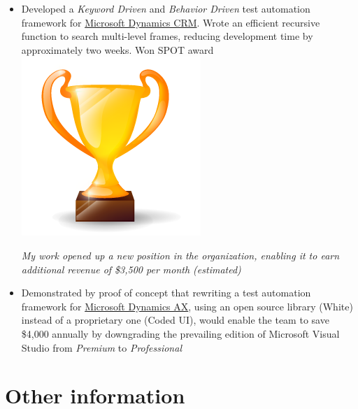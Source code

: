 \documentclass[letterpaper]{tenseconds} %
\begin{document}
\begin{twenty}
{\begin{itemize}
        \item Developed a \textit{Keyword Driven} and \textit{Behavior Driven} test automation framework for \href{https://www.microsoft.com/en-ca/dynamics/crm.aspx}{Microsoft Dynamics CRM}. Wrote an efficient recursive function to search multi-level frames, reducing development time by approximately two weeks. Won SPOT award {\includegraphics[scale=0.05]{img/trophy.png}}
        
        \textit{My work opened up a new position in the organization, enabling it to earn additional revenue of \$3,500 per month (estimated)}
        \item Demonstrated by proof of concept that rewriting a test automation framework for \href{https://www.microsoft.com/en-ca/dynamics/erp-ax-overview.aspx}{Microsoft Dynamics AX}, using an open source library (White) instead of a proprietary one (Coded UI), would enable the team to save \$4,000 annually by downgrading the prevailing edition of Microsoft Visual Studio from \textit{Premium} to \textit{Professional}
    \end{itemize}
        }
 

        
\end{twenty}


\newpage %

\makesecondprofile %

\section{Other information}
\end{document}
